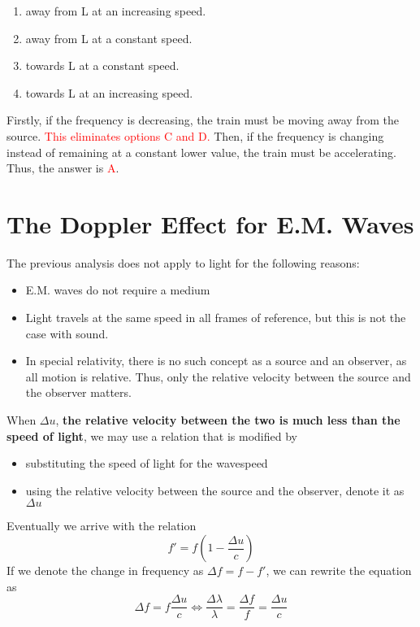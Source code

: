 \documentclass[a4paper,12pt]{article}
\let\oldsection\section
\renewcommand\section{\clearpage\oldsection}
\newcommand{\paren}[1]{\left(#1\right)}
\begin{document}
\begin{enumerate}[label=\Alph*.]
  \item away from L at an increasing speed.
  \item away from L at a constant speed.
  \item towards L at a constant speed.
  \item towards L at an increasing speed.
\end{enumerate}

Firstly, if the frequency is decreasing, the train must be moving away from the source. \textcolor{red}{This eliminates options C and D.} Then, if the frequency is changing instead of remaining at a constant lower value, the train must be accelerating. Thus, the answer is \textcolor{red}{A}.

\section{The Doppler Effect for E.M. Waves}

The previous analysis does not apply to light for the following reasons:
\begin{itemize}
  \item E.M. waves do not require a medium
  \item Light travels at the same speed in all frames of reference, but this is not the case with sound.
  \item In special relativity, there is no such concept as a source and an observer, as all motion is relative. Thus, only the relative velocity between the source and the observer matters.
\end{itemize}

When $\Delta u$, \textbf{the relative velocity between the two is much less than the speed of light}, we may use a relation that is modified by
\begin{itemize}
  \item substituting the speed of light for the wavespeed
  \item using the relative velocity between the source and the observer, denote it as $\Delta u$
\end{itemize}
Eventually we arrive with the relation
\begin{equation}
  f' = f\paren{1 - \frac{\Delta u}{c}}
\end{equation}
If we denote the change in frequency as $\Delta f = f - f'$, we can rewrite the equation as
\begin{equation}
  \Delta f = f\frac{\Delta u}{c} \iff \frac{\Delta \lambda}{\lambda} = \frac{\Delta f}{f} = \frac{\Delta u}{c}
\end{equation}
\end{document}

